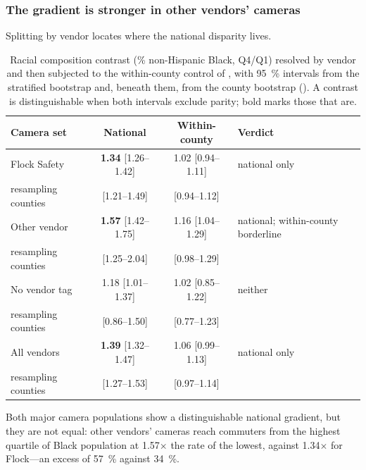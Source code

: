 \documentclass[11pt,twoside]{article}
\begin{document}
\subsubsection*{The gradient is stronger in other vendors' cameras}

Splitting  by vendor locates where the national disparity lives.

\begin{table}[htbp]
\centering
\small
\caption{Racial composition contrast (\% non-Hispanic Black, Q4/Q1) resolved by vendor and
then subjected to the within-county control of , with
\SI{95}{\percent} intervals from the stratified bootstrap and, beneath them, from the county
bootstrap (). A contrast is distinguishable when both intervals exclude
parity; bold marks those that are.}
\label{tab:vendordemo}
\begin{tabular}{lccl}
\toprule
Camera set & National & Within-county & Verdict \\
\midrule
Flock Safety              & \textbf{\num{1.34}} [1.26--1.42] & \num{1.02} [0.94--1.11] & national only \\
\quad resampling counties & [1.21--1.49]            & [0.94--1.12]            & \\
Other vendor              & \textbf{\num{1.57}} [1.42--1.75] & \num{1.16} [1.04--1.29] & national; within-county borderline \\
\quad resampling counties & [1.25--2.04]            & [0.98--1.29]            & \\
No vendor tag             & \num{1.18} [1.01--1.37] & \num{1.02} [0.85--1.22] & neither \\
\quad resampling counties & [0.86--1.50]            & [0.77--1.23]            & \\
\midrule
All vendors               & \textbf{\num{1.39}} [1.32--1.47] & \num{1.06} [0.99--1.13] & national only \\
\quad resampling counties & [1.27--1.53]            & [0.97--1.14]            & \\
\bottomrule
\end{tabular}
\end{table}

Both major camera populations show a distinguishable national gradient, but they are not
equal: other vendors' cameras reach commuters from the highest quartile of Black population at
\num{1.57}$\times$ the rate of the lowest, against \num{1.34}$\times$ for Flock---an excess of
\SI{57}{\percent} against \SI{34}{\percent}.
\end{document}
